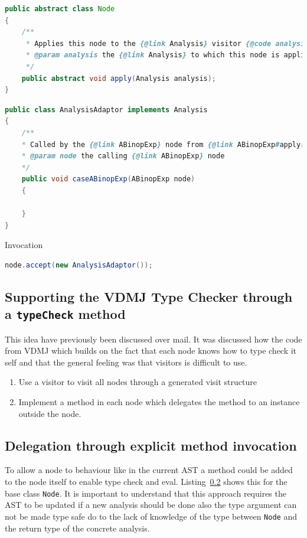 \documentclass{overturerep}
\begin{document}
\begin{lstlisting}[language=java]
public abstract class Node
{
	/**
	 * Applies this node to the {@link Analysis} visitor {@code analysis}.
	 * @param analysis the {@link Analysis} to which this node is applied
	 */
	public abstract void apply(Analysis analysis);
}
\end{lstlisting}

\begin{lstlisting}[language=java]
public class AnalysisAdaptor implements Analysis
{
	/**
	* Called by the {@link ABinopExp} node from {@link ABinopExp#apply(Switch)}.
	* @param node the calling {@link ABinopExp} node
	*/
	public void caseABinopExp(ABinopExp node)
	{

	}
}
\end{lstlisting}

Invocation
\begin{lstlisting}[language=java]
node.accept(new AnalysisAdaptor());
\end{lstlisting}

\subsection{Supporting the VDMJ Type Checker through a \texttt{typeCheck} method}
This idea have previously been discussed over mail. It was discussed how the code from VDMJ which builds on the fact that each node knows how to type check it self and that the general feeling was that visitors is difficult to use.
\begin{enumerate}
\item Use a visitor to visit all nodes through a generated visit structure
\item Implement a method in each node which delegates the method to an instance outside the node.
\end{enumerate}

\subsection{Delegation through explicit method invocation}
To allow a node to behaviour like in the current AST a method could be added to the node itself to enable type check and eval. Listing~\ref{} shows this for the base class \texttt{Node}. It is important to understand that this approach requires the AST to be updated if a new analysis should be done also the type argument can not be made type safe do to the lack of knowledge of the type between \texttt{Node} and the return type of the concrete analysis.
\end{document}
